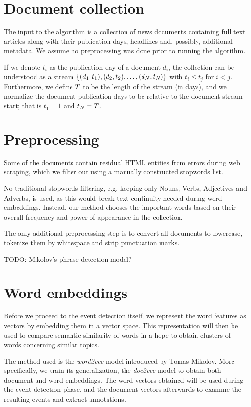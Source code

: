 \section{Document collection}
The input to the algorithm is a collection of news documents containing full text articles along with their publication days, headlines and, possibly, additional metadata. We assume no preprocessing was done prior to running the algorithm.

If we denote $t_{i}$ as the publication day of a document $d_{i}$, the collection can be understood as a stream $\left\{ (d_{1}, t_{1}), (d_{2}, t_{2}), \dots, (d_{N}, t_{N}) \right\}$ with $t_{i} \leq t_{j}$ for $i < j$. Furthermore, we define $T$ to be the length of the stream (in days), and we normalize the document publication days to be relative to the document stream start; that is $t_{1} = 1$ and $t_{N} = T$.


\section{Preprocessing}
Some of the documents contain residual HTML entities from errors during web scraping, which we filter out using a manually constructed stopwords list.

No traditional stopwords filtering, e.g. keeping only Nouns, Verbs, Adjectives and Adverbs, is used, as this would break text continuity needed during word embeddings. Instead, our method chooses the important words based on their overall frequency and power of appearance in the collection.

The only additional preprocessing step is to convert all documents to lowercase, tokenize them by whitespace and strip punctuation marks.

{\color{red} TODO: Mikolov's phrase detection model?}


\section{Word embeddings} \label{word-embeddings}
Before we proceed to the event detection itself, we represent the word features as vectors by embedding them in a vector space. This representation will then be used to compare semantic similarity of words in a hope to obtain clusters of words concerning similar topics.

The method used is the \textit{word2vec} model \cite{word2vec} introduced by Tomas Mikolov. More specifically, we train its generalization, the \textit{doc2vec} model \cite{doc2vec} to obtain both document and word embeddings. The word vectors obtained will be used during the event detection phase, and the document vectors afterwards to examine the resulting events and extract annotations.

